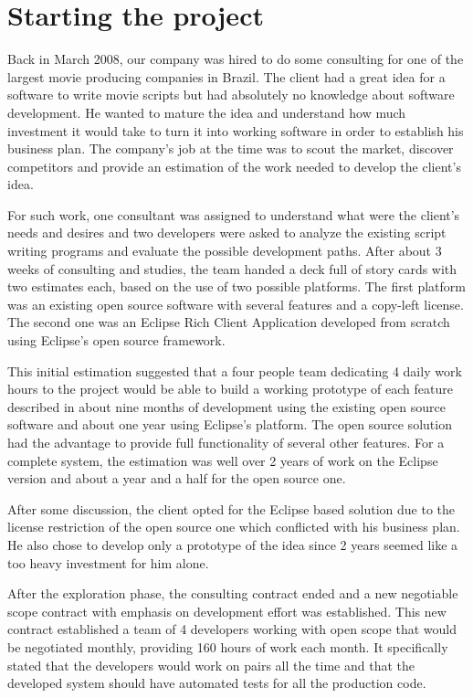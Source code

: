 \documentclass[lnbip]{svmultln}
\begin{document}
\section{Starting the project}
\label{sec:start}

Back in March 2008, our company was hired to do some consulting for
one of the largest movie producing companies in Brazil. The client had
a great idea for a software to write movie scripts but had absolutely
no knowledge about software development.  He wanted to mature the idea
and understand how much investment it would take to turn it into
working software in order to establish his business plan. The
company's job at the time was to scout the market, discover
competitors and provide an estimation of the work needed to develop
the client's idea.

For such work, one consultant was assigned to understand what were the
client's needs and desires and two developers were asked to analyze
the existing script writing programs and evaluate the possible
development paths. After about 3 weeks of consulting and studies, the
team handed a deck full of story cards with two estimates each, based
on the use of two possible platforms. The first platform was an
existing open source software with several features and a copy-left
license. The second one was an Eclipse Rich Client Application
developed from scratch using Eclipse's open source framework.

This initial estimation suggested that a four people team dedicating 4 daily work hours to the project
 would be able to build a working prototype of each feature described in about nine months of development using the
existing open source software and about one year using Eclipse's
platform. The open source solution had the advantage to provide full
functionality of several other features. For a complete system, the
estimation was well over 2 years of work on the Eclipse version and
about a year and a half for the open source one.

After some discussion, the client opted for the Eclipse based solution
due to the license restriction of the open source one which conflicted
with his business plan. He also chose to develop only a prototype of
the idea since 2 years seemed like a too heavy investment for him
alone.

After the exploration phase, the consulting contract ended and a new
negotiable scope contract\cite{tem citação pra esse tipo de contrato?} with emphasis on development effort was established. 
This new contract established a team of 4 developers working with open
scope that would be negotiated monthly, providing 160 hours of work each month. It specifically stated
that the developers would work on pairs all the time and that the
developed system should have automated tests for all the production code.
\end{document}
